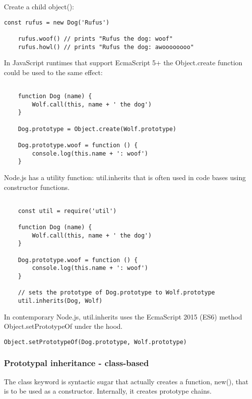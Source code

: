 \documentclass{scrartcl}
\begin{document}
Create a child object():

\begin{lstlisting}[style=ES6]
    const rufus = new Dog('Rufus')

    rufus.woof() // prints "Rufus the dog: woof"
    rufus.howl() // prints "Rufus the dog: awoooooooo"
\end{lstlisting}

 In JavaScript runtimes that support EcmaScript 5+ the Object.create function could be used to the same effect:


\begin{lstlisting}[style=ES6]

    function Dog (name) {
        Wolf.call(this, name + ' the dog')
    }

    Dog.prototype = Object.create(Wolf.prototype)

    Dog.prototype.woof = function () {
        console.log(this.name + ': woof')
    }
\end{lstlisting}

Node.js has a utility function: util.inherits that is often used in code bases using constructor functions.

\begin{lstlisting}[style=ES6]

    const util = require('util')

    function Dog (name) {
        Wolf.call(this, name + ' the dog')
    }

    Dog.prototype.woof = function () {
        console.log(this.name + ': woof')
    }

    // sets the prototype of Dog.prototype to Wolf.prototype
    util.inherits(Dog, Wolf)

\end{lstlisting}

In contemporary Node.js, util.inherits uses the EcmaScript 2015 (ES6) method Object.setPrototypeOf under the hood.

\begin{lstlisting}[style=ES6]
    Object.setPrototypeOf(Dog.prototype, Wolf.prototype)
\end{lstlisting}


\subsubsection{Prototypal inheritance - class-based}

The class keyword is syntactic sugar that actually creates a function, new(), that is to be used as a constructor.
Internally, it creates prototype chains.
\end{document}
